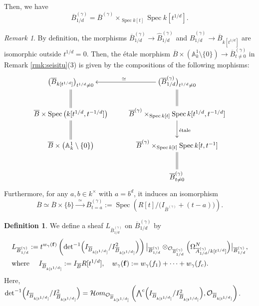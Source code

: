 \documentclass[a4paper,11pt]{amsart}
\theoremstyle{definition}
\newtheorem{defi}[thm]{Definition}
\theoremstyle{remark}
\newtheorem{rmk}[thm]{Remark}
\begin{document}
Then, we have 
\[
\overline{B}^{(\gamma)}_{1/d} = \overline{B}^{(\gamma)} \times _{\operatorname{Spec}k[t]} \operatorname{Spec}k[t^{1/d}]. 
\]
\begin{rmk}\label{rmk:seisitu2}
By definition, the morphisms $\overline{B}^{(\gamma)}_{1/d} \to \widehat{B}^{(\gamma)}_{1/d}$ and $\widehat{B}^{(\gamma)}_{1/d} \to \overline{B}_{k[t^{1/d}]}$ are isomorphic outside $t^{1/d} = 0$. Then, the \'{e}tale morphism $\overline{B} \times \left( \mathbb{A}^1 _k \setminus \{ 0 \} \right) \to \overline{B}^{(\gamma)}_{t \not = 0}$ in Remark \ref{rmk:seisitu}(3) is given by the compositions of the following mophisms: 
\[
  \xymatrix{
  \bigl( \overline{B}_{k[t^{1/d}]} \bigr)_{t^{1/d} \not = 0}  & \bigl( \overline{B}^{(\gamma)}_{1/d} \bigr)_{t^{1/d} \not = 0} \ar[l]_{\simeq} \\
  \overline{B} \times \operatorname{Spec} \left( k[t^{1/d}, t^{-1/d}] \right) \ar@{=}[u] & \overline{B}^{(\gamma)} \times _{\operatorname{Spec}k[t]} \operatorname{Spec}k[t^{1/d}, t^{-1/d}] \ar@{=}[u] \ar[d]^{\text{\'{e}tale}} \\
  \overline{B} \times \left( \mathbb{A}^1 _k \setminus \{ 0 \} \right) \ar@{=}[u] & \overline{B}^{(\gamma)} \times _{\operatorname{Spec}k[t]} \operatorname{Spec}k[t,t^{-1}]  \\
  & \overline{B}^{(\gamma)}_{t \not = 0} \ar@{=}[u]
  }
\]
Furthermore, for any $a, b \in k^{\times}$ with $a = b^d$, it induces an isomorphism 
\[\tag{i}
\overline{B} \simeq \overline{B} \times \{ b \} \xrightarrow{\ \ \simeq \ \ } \overline{B}^{(\gamma)}_{t = a}:= \operatorname{Spec} \left( R[t] / \bigl ( I_{\overline{B} ^{(\gamma)}}+(t-a) \bigr) \right). 
\]
\end{rmk}

\begin{defi}
We define a sheaf $L_{\overline{B}^{(\gamma)}_{1/d}}$ on $\overline{B}^{(\gamma)}_{1/d}$ by
\begin{align*}
& L_{\overline{B}^{(\gamma)}_{1/d}} := t^{w_\gamma({\bf f})} \left( \operatorname{det} ^{-1} \Bigl ( I_{\overline{B}_{k[t^{1/d}]}}/ I^2 _{\overline{B}_{k[t^{1/d}]}} \Bigr ) \right) \big|_{\overline{B}^{(\gamma)}_{1/d}} \otimes _{\mathcal{O}_{\overline{B}^{(\gamma)}_{1/d}}}
\Bigl ( \Omega_{\overline{A}^{(\gamma)}_{1/d}/k[t^{1/d}]} ^N \Bigr ) \big|_{\overline{B}^{(\gamma)}_{1/d}}, \\
&\text{where \quad} I_{\overline{B}_{k[t^{1/d}]}} :=  I_{\overline{B}}R[t^{1/d}], \quad w_\gamma({\bf f}) := w_{\gamma}(f_1) + \cdots + w_{\gamma}(f_c). 
\end{align*}
Here, $\operatorname{det} ^{-1} \Bigl ( I_{\overline{B}_{k[t^{1/d}]}}/ I^2_{\overline{B}_{k[t^{1/d}]}} \Bigr ) = \mathcal{H}om_{\mathcal{O}_{\overline{B}_{k[t^{1/d}]}}} \left( \bigwedge ^{c} \Bigl ( I_{\overline{B}_{k[t^{1/d}]}}/ I^2_{\overline{B}_{k[t^{1/d}]}} \Bigr ), \mathcal{O}_{\overline{B}_{k[t^{1/d}]}} \right)$.
\end{defi}
\end{document}
